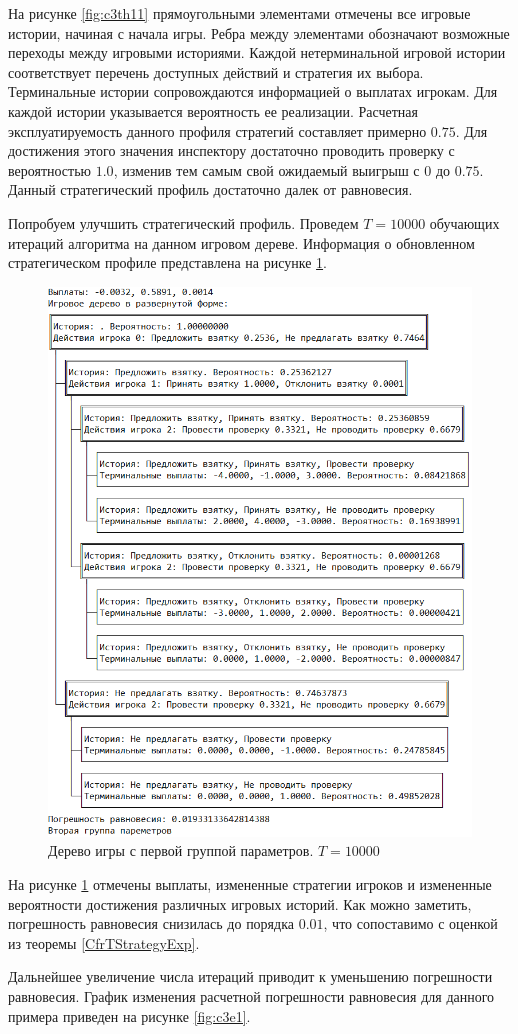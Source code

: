 \par
На рисунке \ref{fig:c3th11} прямоугольными элементами отмечены все игровые истории, начиная с начала игры. Ребра между элементами обозначают возможные переходы между игровыми историями. Каждой нетерминальной игровой истории соответствует перечень доступных действий и стратегия их выбора. Терминальные истории сопровождаются информацией о выплатах игрокам. Для каждой истории указывается вероятность ее реализации. Расчетная эксплуатируемость данного профиля стратегий составляет примерно $0.75$. Для достижения этого значения инспектору достаточно проводить проверку с вероятностью $1.0$, изменив тем самым свой ожидаемый выигрыш с $0$ до $0.75$. Данный стратегический профиль достаточно далек от равновесия.
\par
Попробуем улучшить стратегический профиль. Проведем $T=10000$ обучающих итераций алгоритма на данном игровом дереве. Информация о обновленном стратегическом профиле представлена на рисунке \ref{fig:c3th12}.
\begin{figure}[H]
	\centering
	\includegraphics[width=0.9\linewidth]{inc/img/c3th12}
	\caption{Дерево игры с первой группой параметров. $T = 10000$}
	\label{fig:c3th12}
\end{figure}
\par
На рисунке \ref{fig:c3th12} отмечены выплаты, измененные стратегии игроков и измененные вероятности достижения различных игровых историй. Как можно заметить, погрешность равновесия снизилась до порядка $0.01$, что сопоставимо с оценкой из теоремы \ref{CfrTStrategyExp}.
\par
Дальнейшее увеличение числа итераций приводит к уменьшению погрешности равновесия. График изменения расчетной погрешности равновесия для данного примера приведен на рисунке \ref{fig:c3e1}.

